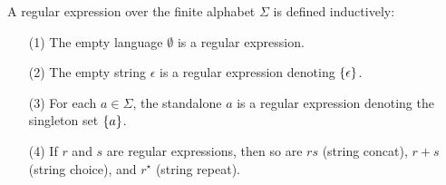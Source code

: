 \documentclass[12pt]{article}
\begin{document}
\begin{definition}
  A regular expression over the finite alphabet \(\Sigma\)
  is defined inductively:
  \begin{enumerate}
    \item[(1)]
      The empty language \(\emptyset\) is a regular expression.

    \item[(2)]
      The empty string \(\epsilon\) is a regular expression denoting
      \(\left\{\epsilon\right\}\).

    \item[(3)]
      For each \(a \in \Sigma\),
      the standalone \(a\) is a regular expression
      denoting the singleton set \(\left\{a\right\}\).

    \item[(4)]
      If \(r\) and \(s\) are regular expressions, then so are
      \(rs\) (string concat), \(r + s\) (string choice),
      and \(r^\star\) (string repeat).
  \end{enumerate}
\end{definition}
\end{document}
